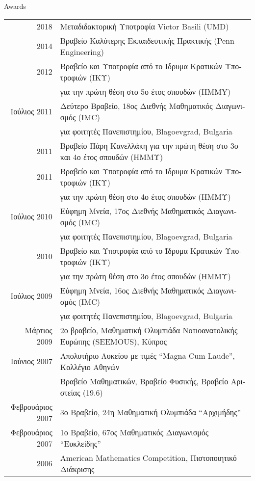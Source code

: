\documentclass{resume} %
\begin{document}
\begin{rSection}{Awards}

  \begin{longtable}{rl}
  2018 & \textgreek{Μεταδιδακτορική Υποτροφία} Victor Basili (UMD)\\
  2014 & \textgreek{Βραβείο Καλύτερης Εκπαιδευτικής Πρακτικής} (Penn Engineering) \\
  2012 & \textgreek{Βραβείο και Υποτροφία από το Ίδρυμα Κρατικών Υποτροφιών (ΙΚΥ)} \\
    & \textgreek{για την πρώτη θέση στο 5ο έτος σπουδών (HMMY)} \\
  \textgreek{Ιούλιος} 2011  & \textgreek{Δεύτερο Βραβείο, 18ος Διεθνής Μαθηματικός Διαγωνισμός} (IMC) \\
  & \textgreek{για φοιτητές Πανεπιστημίου}, Blagoevgrad, Bulgaria \\
  
  2011 & \textgreek{Βραβείο Πάρη Κανελλάκη για την πρώτη θέση στο 3ο και 4ο έτος σπουδών (ΗΜΜΥ)}\\
  2011 & \textgreek{Βραβείο και Υποτροφία από το Ίδρυμα Κρατικών Υποτροφιών (ΙΚΥ)} \\
    & \textgreek{για την πρώτη θέση στο 4ο έτος σπουδών (ΗΜΜΥ)} \\
  \textgreek{Ιούλιος} 2010  & \textgreek{Εύφημη Μνεία, 17ος Διεθνής Μαθηματικός Διαγωνισμός} (IMC) \\
    & \textgreek{για φοιτητές Πανεπιστημίου}, Blagoevgrad, Bulgaria \\

  2010 & \textgreek{Βραβείο και Υποτροφία από το Ίδρυμα Κρατικών Υποτροφιών (ΙΚΥ)} \\
    & \textgreek{για την πρώτη θέση στο 3ο έτος σπουδών (ΗΜΜΥ)} \\
  \textgreek{Ιούλιος} 2009  & \textgreek{Εύφημη Μνεία, 16ος Διεθνής Μαθηματικός Διαγωνισμός} (IMC) \\
    & \textgreek{για φοιτητές Πανεπιστημίου}, Blagoevgrad, Bulgaria \\

  \textgreek{Μάρτιος} 2009  & \textgreek{2ο βραβείο, Μαθηματική Ολυμπιάδα Νοτιοανατολικής Ευρώπης} (SEEMOUS), \textgreek{Κύπρος}\\

  \textgreek{Ιούνιος}  2007 & \textgreek{Απολυτήριο Λυκείου με τιμές} “Magna  Cum  Laude”, \textgreek{Κολλέγιο Αθηνών}\\
             &   \textgreek{Βραβείο Μαθηματικών, Βραβείο Φυσικής, Βραβείο Αριστείας (19.6)}\\
  \textgreek{Φεβρουάριος} 2007 & \textgreek{3ο Βραβείο, 24η Μαθηματική Ολυμπιάδα ``Αρχιμήδης''} \\
  \textgreek{Φεβρουάριος} 2007 & \textgreek{1ο Βραβείο, 67ος Μαθηματικός Διαγωνισμός ``Ευκλείδης''} \\
  2006 &  American Mathematics Competition, \textgreek{Πιστοποιητικό Διάκρισης}\\


\end{longtable}
\end{rSection}
\end{document}
